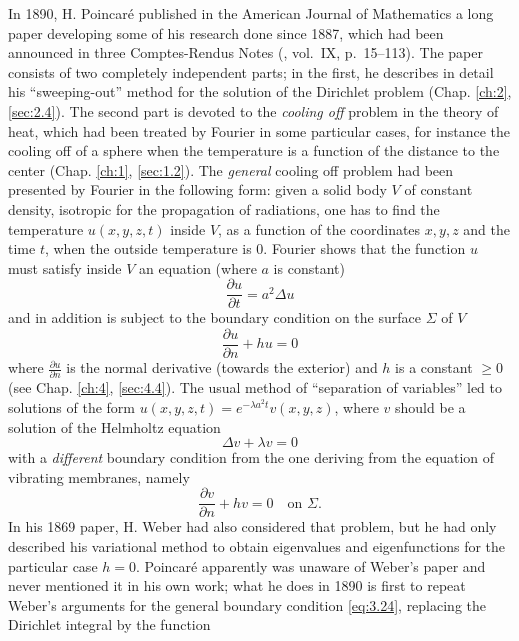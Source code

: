 \documentclass[12pt,a4paper,leqno,twoside]{extbook}
\newcommand{\pder}[2]{\frac{\partial #1}{\partial #2}}
\begin{document}
In 1890, H. Poincaré published in the American Journal of Mathematics a long paper developing some of his research done since 1887, which had been announced in three Comptes-Rendus Notes (\cite{177}, vol.~IX, p.~15--113). The paper consists of two completely independent parts; in the first, he describes in detail his ``sweeping-out'' method for the solution of the Dirichlet problem (Chap. \ref{ch:2}, \ref{sec:2.4}). The second part is devoted to the \emph{cooling off} problem in the theory of heat, which had been treated by Fourier in some particular cases, for instance the cooling off of a sphere when the temperature is a function of the distance to the center (Chap. \ref{ch:1}, \ref{sec:1.2}). The \emph{general} cooling off problem had been presented by Fourier in the following form: given a solid body \(V\) of constant density, isotropic for the propagation of radiations, one has to find the temperature \(u(x,y,z,t)\) inside \(V\), as a function of the coordinates \(x, y, z\) and the time \(t\), when the outside temperature is 0. Fourier shows that the function \(u\) must satisfy inside \(V\) an equation (where \(a\) is constant)
\begin{equation}
    \label{eq:3.21}
    \pder{u}{t} = a^2 \Delta u
\end{equation}
and in addition is subject to the boundary condition on the surface \(\Sigma\) of \(V\)
\begin{equation}
    \label{eq:3.22}
    \pder{u}{n} + hu = 0
\end{equation}
where \(\pder{u}{n}\) is the normal derivative (towards the exterior) and \(h\) is a constant \(\geq 0\) (see Chap. \ref{ch:4}, \ref{sec:4.4}). The usual method of ``separation of variables'' led to solutions of the form \(u(x,y,z,t) = e^{-\lambda a^2 t} v(x,y,z)\), where \(v\) should be a solution of the Helmholtz equation
\begin{equation}
    \label{eq:3.23}
    \Delta v + \lambda v = 0
\end{equation}
with a \emph{different} boundary condition from the one deriving from the equation of vibrating membranes, namely
\begin{equation}
    \label{eq:3.24}
    \pder{v}{n} + hv = 0 \quad \text{on } \Sigma.
\end{equation}
In his 1869 paper, H. Weber had also considered that problem, but he had only described his variational method to obtain eigenvalues and eigenfunctions for the particular case \(h=0\). Poincaré apparently was unaware of Weber's paper and never mentioned it in his own work; what he does in 1890 is first to repeat Weber's arguments for the general boundary condition \eqref{eq:3.24}, replacing the Dirichlet integral by the function
\end{document}
